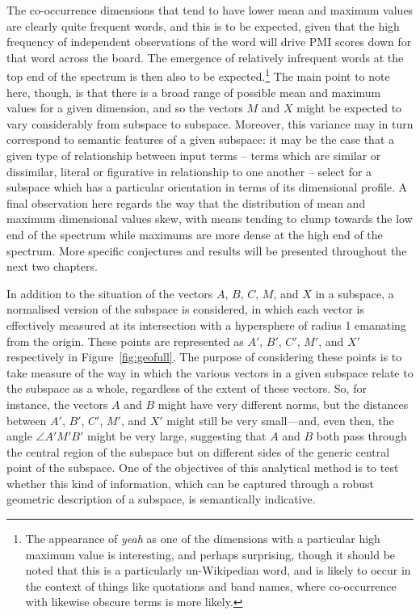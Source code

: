 The co-occurrence dimensions that tend to have lower mean and maximum values are clearly quite frequent words, and this is to be expected, given that the high frequency of independent observations of the word will drive PMI scores down for that word across the board.  The emergence of relatively infrequent words at the top end of the spectrum is then also to be expected.\footnote{The appearance of \emph{yeah} as one of the dimensions with a particular high maximum value is interesting, and perhaps surprising, though it should be noted that this is a particularly un-Wikipedian word, and is likely to occur in the context of things like quotations and band names, where co-occurrence with likewise obscure terms is more likely.}  The main point to note here, though, is that there is a broad range of possible mean and maximum values for a given dimension, and so the vectors $M$ and $X$ might be expected to vary considerably from subspace to subspace.  Moreover, this variance may in turn correspond to semantic features of a given subspace: it may be the case that a given type of relationship between input terms -- terms which are similar or dissimilar, literal or figurative in relationship to one another -- select for a subspace which has a particular orientation in terms of its dimensional profile.  A final observation here regards the way that the distribution of mean and maximum dimensional values skew, with means tending to clump towards the low end of the spectrum while maximums are more dense at the high end of the spectrum.  More specific conjectures and results will be presented throughout the next two chapters.

In addition to the situation of the vectors $A$, $B$, $C$, $M$, and $X$ in a subspace, a normalised version of the subspace is considered, in which each vector is effectively measured at its intersection with a hypersphere of radius 1 emanating from the origin.  These points are represented as $A'$, $B'$, $C'$, $M'$, and $X'$ respectively in Figure~\ref{fig:geofull}.  The purpose of considering these points is to take measure of the way in which the various vectors in a given subspace relate to the subspace as a whole, regardless of the extent of these vectors.  So, for instance, the vectors $A$ and $B$ might have very different norms, but the distances between $A'$, $B'$, $C'$, $M'$, and $X'$ might still be very small---and, even then, the angle $\angle A'M'B'$ might be very large, suggesting that $A$ and $B$ both pass through the central region of the subspace but on different sides of the generic central point of the subspace.  One of the objectives of this analytical method is to test whether this kind of information, which can be captured through a robust geometric description of a subspace, is semantically indicative.

